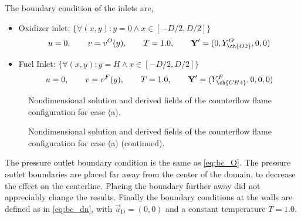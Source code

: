 The boundary condition of the inlets are,
\begin{itemize}
	\item Oxidizer inlet: $\{\forall (x,y): y = 0 \land x \in [-D/2, D/2]\}$\\
	\begin{equation*}
		u = 0,\qquad v= v^O(y), \qquad T = 1.0, \qquad \vec{Y}' = (0,Y^O_{\ch{O2}},0,0)
	\end{equation*}
	\item Fuel Inlet: $\{\forall (x,y): y = H \land x \in [-D/2, D/2]\} $ \\
	\begin{equation*}
		u = 0,\qquad v= v^F(y), \qquad T = 1.0, \qquad \vec{Y}' = (Y^F_{\ch{CH4}},0,0,0)
	\end{equation*}
\end{itemize}
 
\begin{figure}[p]
	\centering
	\pgfplotsset{width=0.73\textwidth, compat=1.3}
	\caption{Nondimensional solution and derived fields of the counterflow flame configuration for case (a).} \label{fig:CounterFlowFlameFig1}
\end{figure}
\begin{figure}[p]
	\ContinuedFloat
	\centering
	\pgfplotsset{width=0.73\textwidth, compat=1.3}		
	\caption{Nondimensional solution and derived fields of the counterflow flame configuration for case (a) (continued).}%
\end{figure} 


The pressure outlet boundary condition is the same as \cref{eq:bc_O}. The pressure outlet boundaries are placed far away from the center of the domain, to decrease the effect on the centerline. Placing the boundary further away did not appreciably change the results. Finally the boundary conditions at the walls are defined as in \cref{eq:bc_dn}, with $\vec{u}_{\text{D}} = (0,0)$ and a constant temperature $T = 1.0$.          
 
